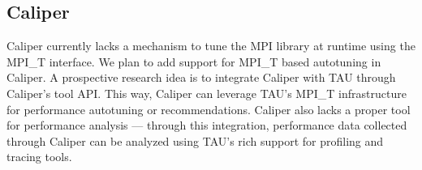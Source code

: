 \subsection{Caliper}
Caliper currently lacks a mechanism to tune the MPI library at runtime using the MPI\_T interface. We plan to add support for MPI\_T based autotuning in Caliper. A prospective research idea is to integrate Caliper with TAU through Caliper's tool API. This way, Caliper can leverage TAU's MPI\_T infrastructure for performance autotuning or recommendations. Caliper also lacks a proper tool for performance analysis --- through this integration, performance data collected through Caliper can be analyzed using TAU's rich support for profiling and tracing tools.
